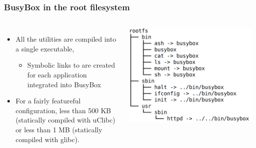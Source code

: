 \begin{frame}
  \frametitle{BusyBox in the root filesystem}
  \begin{columns}
      \begin{itemize}
      \item All the utilities are compiled into a single executable,
        \begin{itemize}
        \item Symbolic links to  are created for each
          application integrated into BusyBox
        \end{itemize}
      \item For a fairly featureful configuration, less than 500 KB
        (statically compiled with uClibc) or less than 1 MB (statically
        compiled with glibc).
      \end{itemize}
      \includegraphics[width=\textwidth]{slides/sysdev-busybox/busybox-tree.png}
  \end{columns}
\end{frame}

